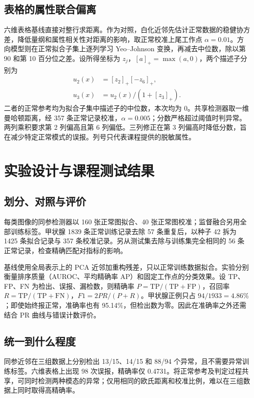 \documentclass[sigconf,nonacm,screen]{acmart}
\begin{document}
\subsection{表格的属性联合偏离}
六维表格基线直接对整行求距离。作为对照，白化近邻先估计正常数据的稳健协方差，降低量纲和属性相关性对距离的影响，取正常校准上尾工作点 $\alpha=0.01$。方向模型则在正常拟合子集上逐列学习 Yeo--Johnson 变换\cite{yeo2000}，再减去中位数，除以第 90 和第 10 百分位之差。设所得坐标为 $z_j$，$[a]_+=\max(a,0)$，两个描述子分别为
\begin{align}
u_2(x)&=[z_2]_+[-z_6]_+ ,\\
u_3(x)&=u_2(x)/(1+[z_3]_+).
\end{align}
二者的正常参考均为拟合子集中描述子的中位数，本次均为 0。共享检测器取一维曼哈顿距离，经 357 条正常记录校准，$\alpha=0.005$；分数严格超过阈值时判异常。两列乘积要求第 2 列偏高且第 6 列偏低。三列修正在第 3 列偏高时降低分数，旨在减少特定正常模式的误报。列号只代表课程提供的脱敏属性。

\section{实验设计与课程测试结果}
\begin{table}[t]\centering\caption{课程测试集上的逐方法比较。计数依次为真负、假正、假负、真正。相同测试样本用于各行比较。}\label{tab:results}
\setlength{\tabcolsep}{3.7pt}\end{table}

\subsection{划分、对照与评价}
每类图像的同参检测器以 160 张正常图拟合、40 张正常图校准；监督融合另用全部训练标签。甲状腺 1839 条正常训练记录去除 57 条重复后，以种子 42 拆为 1425 条拟合记录与 357 条校准记录。另从测试集去除与训练集完全相同的 56 条正常记录，检查精确匹配对指标的影响。

基线使用全局表示上的 PCA 近邻加重构残差，只以正常训练数据拟合。实验分别衡量排序质量（AUROC、平均精确率 AP）和固定工作点的分类效果。设 TP、FP、FN 为检出、误报、漏检数，则精确率 $P=\mathrm{TP}/(\mathrm{TP}+\mathrm{FP})$，召回率 $R=\mathrm{TP}/(\mathrm{TP}+\mathrm{FN})$，$F1=2PR/(P+R)$。甲状腺正例只占 $94/1933=4.86\%$；即使始终报正常，准确率也有 95.14\%，但检出数为零。因此在准确率之外还需结合 PR 曲线与错误计数评价\cite{davis2006}。

\subsection{统一到什么程度}
同参近邻在三组数据上分别检出 13/15、14/15 和 88/94 个异常，且不需要异常训练标签。六维表格上出现 98 次误报，精确率仅 0.4731。将正常参考及判定过程共享，可同时检测两种模态的异常；仅用相同的欧氏距离和校准比例，难以在三组数据上同时取得高精确率。
\end{document}
